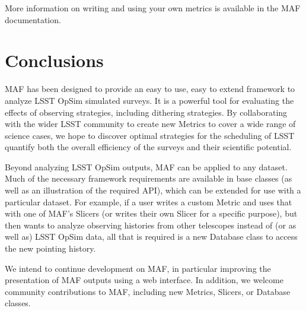 \documentclass[]{spie}  %
\begin{document}
More information on writing and using your own metrics is available in
the MAF documentation. 


\section{Conclusions}

MAF has been designed to provide an easy to use, easy to extend
framework to analyze LSST OpSim simulated surveys. It is a powerful
tool for evaluating the effects of observing strategies, including
dithering strategies.  By collaborating with the wider LSST community
to create new Metrics to cover a wide range of science cases, we hope
to discover optimal strategies for the scheduling of LSST quantify
both the overall efficiency of the surveys and their scientific
potential.

Beyond analyzing LSST OpSim outputs, MAF can be applied to any
dataset. Much of the necessary framework requirements are available in
base classes (as well as an illustration of the required API), which
can be extended for use with a particular dataset. For example, if a
user writes a custom Metric and uses that with one of MAF's
Slicers (or writes their own Slicer for a specific purpose), but then
wants to analyze observing histories from other telescopes instead of
(or as well as) LSST OpSim data, all that is required is a new
Database class to access the new pointing history.

We intend to continue development on MAF, in particular improving the
presentation of MAF outputs using a web interface. In addition, we
welcome community contributions to MAF, including new Metrics,
Slicers, or Database classes.  

\appendix
\end{document}
